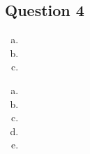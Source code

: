 \documentclass{article}
\begin{document}

\subsection*{Question 4}

\begin{enumerate}[(a)]
	\item 
	
	
	\item 
	
	
	\item 
	
	
\end{enumerate}

\begin{enumerate}[(a)]
	\item 
	
	
	\item 
	
	
	\item 
	
	
	\item 
	
	
	\item 
	
	
\end{enumerate}

\end{document}
